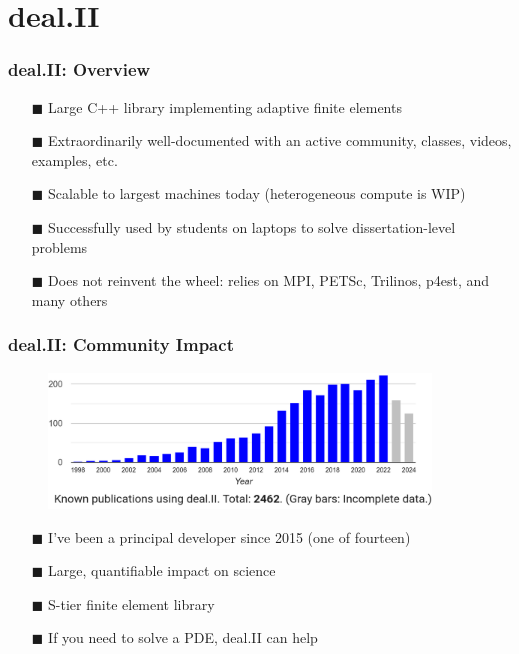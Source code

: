 \documentclass[8pt]{beamer}
\begin{document}
\section{deal.II}
\begin{frame}
    \frametitle{deal.II: Overview}
    \begin{figure}
        \centering
    \end{figure}
    \begin{itemize}
        \item[$\blacksquare$] Large C++ library implementing adaptive finite elements
        \item[$\blacksquare$] Extraordinarily well-documented with an active 
                             community, classes, videos, examples, etc.
        \item[$\blacksquare$] Scalable to largest machines today (heterogeneous compute is WIP)
        \item[$\blacksquare$] Successfully used by students on laptops to solve dissertation-level problems
        \item[$\blacksquare$] Does not reinvent the wheel: relies on MPI, PETSc, Trilinos, p4est, and many others
    \end{itemize}
\end{frame}

\begin{frame}
    \frametitle{deal.II: Community Impact}
    \begin{figure}
        \centering
        \includegraphics[width=4in]{publications.png}
    \end{figure}
    \begin{itemize}
        \item[$\blacksquare$] I've been a principal developer since 2015 (one of fourteen)
        \item[$\blacksquare$] Large, quantifiable impact on science
        \item[$\blacksquare$] S-tier finite element library
        \item[$\blacksquare$] If you need to solve a PDE, deal.II can help
    \end{itemize}
\end{frame}
\end{document}
